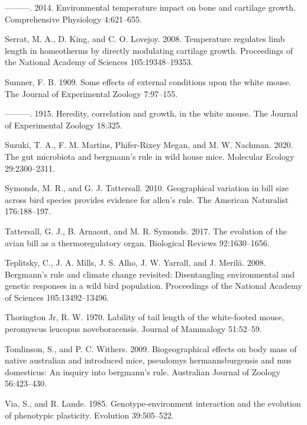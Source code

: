 \documentclass[]{article}
\begin{document}
\leavevmode\hypertarget{ref-Serrat2014}{}%
---------. 2014. Environmental temperature impact on bone and cartilage
growth. Comprehensive Physiology 4:621--655.

\leavevmode\hypertarget{ref-Serrat2008}{}%
Serrat, M. A., D. King, and C. O. Lovejoy. 2008. Temperature regulates
limb length in homeotherms by directly modulating cartilage growth.
Proceedings of the National Academy of Sciences 105:19348--19353.

\leavevmode\hypertarget{ref-Sumner1909}{}%
Sumner, F. B. 1909. Some effects of external conditions upon the white
mouse. The Journal of Experimental Zoology 7:97--155.

\leavevmode\hypertarget{ref-Sumner1915}{}%
---------. 1915. Heredity, correlation and growth, in the white mouse.
The Journal of Experimental Zoology 18:325.

\leavevmode\hypertarget{ref-Suzuki2020}{}%
Suzuki, T. A., F. M. Martins, Phifer-Rixey Megan, and M. W. Nachman.
2020. The gut microbiota and bergmann's rule in wild house mice.
Molecular Ecology 29:2300--2311.

\leavevmode\hypertarget{ref-Symonds2010}{}%
Symonds, M. R., and G. J. Tattersall. 2010. Geographical variation in
bill size across bird species provides evidence for allen's rule. The
American Naturalist 176:188--197.

\leavevmode\hypertarget{ref-Tattersall2017}{}%
Tattersall, G. J., B. Arnaout, and M. R. Symonds. 2017. The evolution of
the avian bill as a thermoregulatory organ. Biological Reviews
92:1630--1656.

\leavevmode\hypertarget{ref-Teplitsky2008}{}%
Teplitsky, C., J. A. Mills, J. S. Alho, J. W. Yarrall, and J. Merilä.
2008. Bergmann's rule and climate change revisited: Disentangling
environmental and genetic responses in a wild bird population.
Proceedings of the National Academy of Sciences 105:13492--13496.

\leavevmode\hypertarget{ref-Thorington1970}{}%
Thorington Jr, R. W. 1970. Lability of tail length of the white-footed
mouse, peromyscus leucopus noveboracensis. Journal of Mammalogy
51:52--59.

\leavevmode\hypertarget{ref-Tomlinson2009}{}%
Tomlinson, S., and P. C. Withers. 2009. Biogeographical effects on body
mass of native australian and introduced mice, pseudomys
hermannsburgensis and mus domesticus: An inquiry into bergmann's rule.
Australian Journal of Zoology 56:423--430.

\leavevmode\hypertarget{ref-Via1985}{}%
Via, S., and R. Lande. 1985. Genotype-environment interaction and the
evolution of phenotypic plasticity. Evolution 39:505--522.
\end{document}
